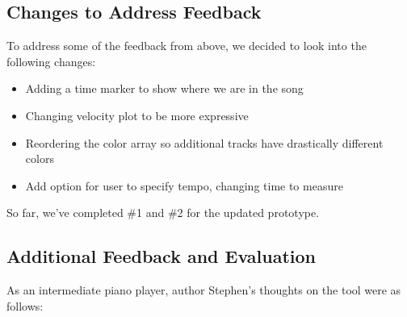 \documentclass[journal]{vgtc}                %
\begin{document}
\subsection{Changes to Address Feedback}

To address some of the feedback from above, we decided to look into the
following changes:

\begin{itemize}
  \item Adding a time marker to show where we are in the song
  \item Changing velocity plot to be more expressive
  \item Reordering the color array so additional tracks have drastically different colors
  \item Add option for user to specify tempo, changing time to measure
\end{itemize}

So far, we’ve completed \#1 and \#2 for the updated prototype.

\subsection{Additional Feedback and Evaluation}

As an intermediate piano player, author Stephen’s thoughts on the tool were as follows:
\end{document}
